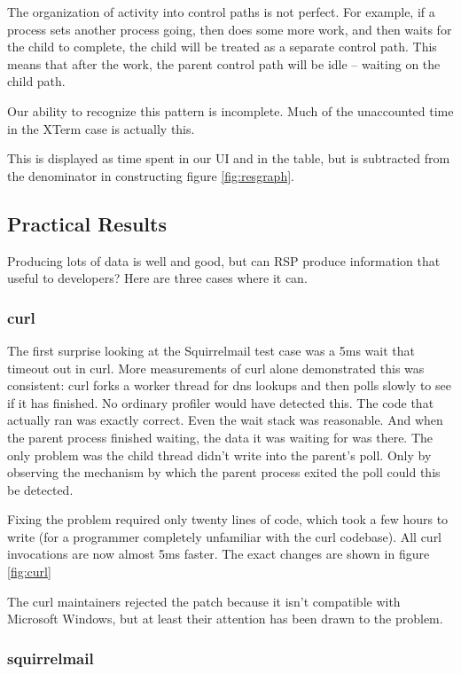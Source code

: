 \documentclass[10pt]{article}
\begin{document}
The organization of activity into control paths is not perfect.  For example, if a process sets another process going, then does some more work, and then waits for the child to complete, the child will be treated as a separate control path.  This means that after the work, the parent control path will be idle -- waiting on the child path.

Our ability to recognize this pattern is incomplete.  Much of the unaccounted time in the XTerm case is actually this.

This is displayed as time spent in our UI and in the table, but is subtracted from the denominator in constructing figure \ref{fig:resgraph}.

\subsection{Practical Results}

Producing lots of data is well and good, but can RSP produce information that useful to developers?  Here are three cases where it can.

\subsubsection{curl}

The first surprise looking at the Squirrelmail test case was a 5ms wait that timeout out in curl.  More measurements of curl alone demonstrated this was consistent: curl forks a worker thread for dns lookups and then polls slowly to see if it has finished.  No ordinary profiler would have detected this.  The code that actually ran was exactly correct.  Even the wait stack was reasonable.  And when the parent process finished waiting, the data it was waiting for was there.  The only problem was the child thread didn't write into the parent's poll.  Only by observing the mechanism by which the parent process exited the poll could this be detected.

Fixing the problem required only twenty lines of code, which took a few hours to write (for a programmer completely unfamiliar with the curl codebase).  All curl invocations are now almost 5ms faster.  The exact changes are shown in figure \ref{fig:curl}

The curl maintainers rejected the patch because it isn't compatible with Microsoft Windows, but at least their attention has been drawn to the problem.

\subsubsection{squirrelmail}
\end{document}
